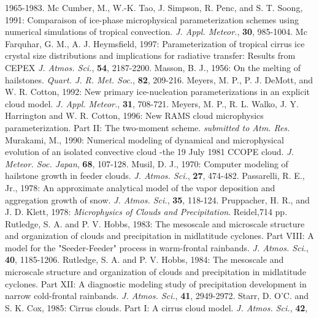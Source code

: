       1965-1983.
\decrefname
Mc Cumber, M., W.-K. Tao, J. Simpson, R. Penc, and S. T. Soong, 1991:
      Comparaison of ice-phase microphysical parameterization schemes using
      numerical simulations of tropical convection.
      {\it J. Appl. Meteor.},
      {\bf 30},
      985-1004.
\decrefname
Mc Farquhar, G. M., A. J. Heymsfield, 1997:
      Parameterization of tropical cirrus ice crystal size distributions and
      implications for radiative transfer: Results from CEPEX
      {\it J. Atmos. Sci.},
      {\bf 54},
      2187-2200.
\decrefname
Masson, B. J., 1956:
      On the melting of hailstones.
      {\it Quart. J. R. Met. Soc.},
      {\bf 82},
      209-216.
\decrefname
Meyers, M. P., P. J. DeMott, and W. R. Cotton, 1992:
      New primary ice-nucleation parameterizations in an explicit cloud model.
      {\it J. Appl. Meteor.},
      {\bf 31},
      708-721.
\decrefname
Meyers, M. P., R. L. Walko, J. Y. Harrington and W. R. Cotton, 1996:
      New RAMS cloud microphysics parameterization. Part II: The two-moment
      scheme.
      {\it submitted to Atm. Res.}
\decrefname
Murakami, M., 1990:
      Numerical modeling of dynamical and microphysical evolution of an isolated
      convective cloud -the 19 July 1981 CCOPE cloud.
      {\it J. Meteor. Soc. Japan},
      {\bf 68},
      107-128.
\decrefname
Musil, D. J., 1970:
      Computer modeling of hailstone growth in feeder clouds.
      {\it J. Atmos. Sci.},
      {\bf 27},
      474-482.
\decrefname
Passarelli, R. E., Jr., 1978:
      An approximate analytical model of the vapor deposition and aggregation
      growth of snow.
      {\it J. Atmos. Sci.},
      {\bf 35},
      118-124.
\decrefname
Pruppacher, H. R., and J. D. Klett, 1978:
      {\it Microphysics of Clouds and Precipitation}.
      Reidel,714 pp.
\decrefname
Rutledge, S. A. and P. V. Hobbs, 1983:
      The mesoscale and microscale structure and organization of clouds and
      precipitation in midlatitude cyclones. Part VIII: A model for the
      "Seeder-Feeder" process in warm-frontal rainbands.
      {\it J. Atmos. Sci.},
      {\bf 40},
      1185-1206.
\decrefname
Rutledge, S. A. and P. V. Hobbs, 1984:
      The mesoscale and microscale structure and organization of clouds and
      precipitation in midlatitude cyclones. Part XII: A diagnostic modeling
      study of precipitation development in narrow cold-frontal rainbands.
      {\it J. Atmos. Sci.},
      {\bf 41},
      2949-2972.
\decrefname
Starr, D. O'C. and S. K. Cox, 1985:
      Cirrus clouds. Part I: A cirrus cloud model.
      {\it J. Atmos. Sci.},
      {\bf 42},
